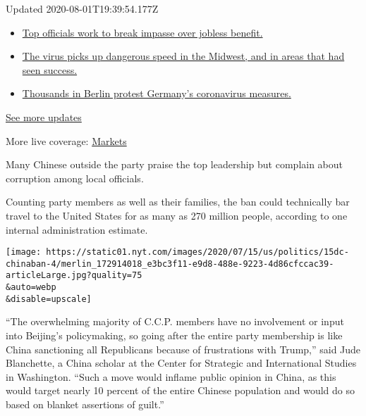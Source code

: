 Updated 2020-08-01T19:39:54.177Z

\begin{itemize}
\tightlist
\item
  \href{https://www.nytimes.com/2020/08/01/world/coronavirus-covid-19.html?action=click\&pgtype=Article\&state=default\&region=MAIN_CONTENT_1\&context=storylines_live_updates\#link-3ac56579}{Top
  officials work to break impasse over jobless benefit.}
\item
  \href{https://www.nytimes.com/2020/08/01/world/coronavirus-covid-19.html?action=click\&pgtype=Article\&state=default\&region=MAIN_CONTENT_1\&context=storylines_live_updates\#link-8796723}{The
  virus picks up dangerous speed in the Midwest, and in areas that had
  seen success.}
\item
  \href{https://www.nytimes.com/2020/08/01/world/coronavirus-covid-19.html?action=click\&pgtype=Article\&state=default\&region=MAIN_CONTENT_1\&context=storylines_live_updates\#link-25930521}{Thousands
  in Berlin protest Germany's coronavirus measures.}
\end{itemize}

\href{https://www.nytimes.com/2020/08/01/world/coronavirus-covid-19.html?action=click\&pgtype=Article\&state=default\&region=MAIN_CONTENT_1\&context=storylines_live_updates}{See
more updates}

More live coverage:
\href{https://www.nytimes.com/live/2020/07/31/business/stock-market-today-coronavirus?action=click\&pgtype=Article\&state=default\&region=MAIN_CONTENT_1\&context=storylines_live_updates}{Markets}

Many Chinese outside the party praise the top leadership but complain
about corruption among local officials.

Counting party members as well as their families, the ban could
technically bar travel to the United States for as many as 270 million
people, according to one internal administration estimate.

\texttt{[image: https://static01.nyt.com/images/2020/07/15/us/politics/15dc-chinaban-4/merlin\_172914018\_e3bc3f11-e9d8-488e-9223-4d86cfccac39-articleLarge.jpg?quality=75\\\&auto=webp\\\&disable=upscale]}

``The overwhelming majority of C.C.P. members have no involvement or
input into Beijing's policymaking, so going after the entire party
membership is like China sanctioning all Republicans because of
frustrations with Trump,'' said Jude Blanchette, a China scholar at the
Center for Strategic and International Studies in Washington. ``Such a
move would inflame public opinion in China, as this would target nearly
10 percent of the entire Chinese population and would do so based on
blanket assertions of guilt.''

